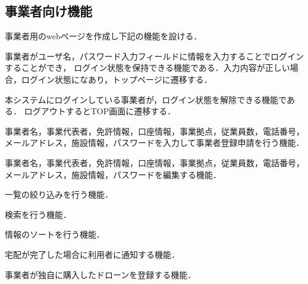 \documentclass[a4paper, titlepage]{jsarticle}
\begin{document}
\subsection{事業者向け機能}
事業者用のwebページを作成し下記の機能を設ける．
\begin{description}[labelwidth=\linewidth]
  \setlength{\leftskip}{1em}

  \item [ログイン機能]  事業者がユーザ名，パスワード入力フィールドに情報を入力することでログインすることができ，
  ログイン状態を保持できる機能である．入力内容が正しい場合，ログイン状態になあり，トップページに遷移する．
  \item [ログアウト機能]  本システムにログインしている事業者が，ログイン状態を解除できる機能である．
  ログアウトするとTOP画面に遷移する．
  \item [事業者登録申請機能]  事業者名，事業代表者，免許情報，口座情報，事業拠点，従業員数，電話番号，メールアドレス，施設情報，パスワードを入力して事業者登録申請を行う機能．
  \item [事業者情報編集機能]  事業者名，事業代表者，免許情報，口座情報，事業拠点，従業員数，電話番号，メールアドレス，施設情報，パスワードを編集する機能．


  \item [絞り込み機能] 一覧の絞り込みを行う機能．
  \item [検索機能] 検索を行う機能．
  \item [情報ソート機能] 情報のソートを行う機能．
  \item [配達完了通知機能]  宅配が完了した場合に利用者に通知する機能．
  \item [使用ドローン登録機能]  事業者が独自に購入したドローンを登録する機能．


\end{description}
\end{document}
